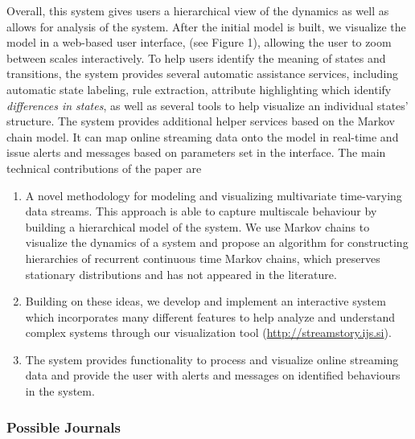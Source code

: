 Overall, this system gives users a hierarchical view of the dynamics as well as 
allows for analysis of the system. After the initial model is built, we visualize the model
in a web-based user interface, (see Figure 1), allowing the 
user to zoom between scales interactively. To help users identify the
meaning of states and transitions, the system provides several automatic assistance services,
including automatic state labeling, rule extraction, attribute highlighting which
identify \emph{differences in states}, as well as several tools to help visualize an individual states'
structure. 
%
The system provides additional helper  services based on the Markov chain model. It can map online streaming data onto 
the model in real-time and issue alerts and messages based on parameters set in the interface. %
%
The main technical contributions of the paper are
\begin{enumerate}{}
  \item A novel methodology for modeling and visualizing multivariate time-varying data streams. This approach is able to capture multiscale behaviour by building a hierarchical model of the system. We use Markov chains to visualize the dynamics of a system and propose an algorithm for constructing hierarchies of recurrent continuous time Markov chains, which preserves stationary distributions and has not appeared in the literature. %
  \item Building on these ideas, we develop and implement an interactive system which incorporates many different features to help analyze and understand complex systems through our visualization tool (\url{http://streamstory.ijs.si}).
  \item The system provides functionality to process and visualize online streaming data and provide the user with  alerts and messages on identified behaviours in the system.  
\end{enumerate}


\subsubsection{Possible Journals}

